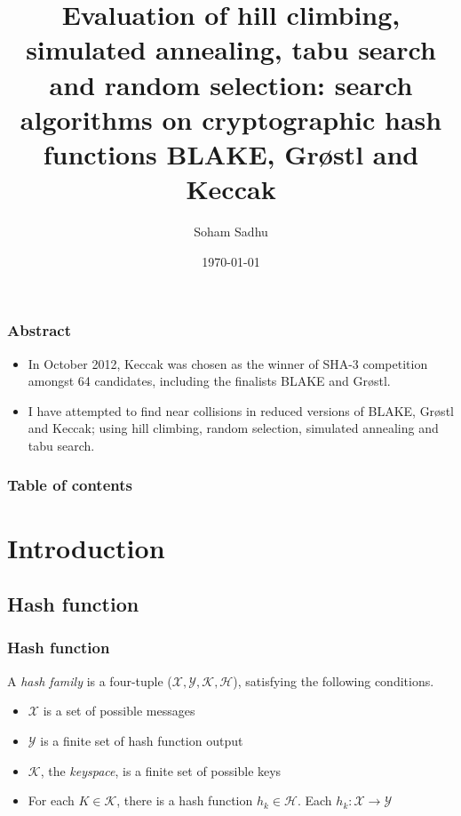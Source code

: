 \documentclass{beamer}
\begin{document}
\title{Evaluation of hill climbing, simulated annealing, tabu search and random selection: search algorithms
       on cryptographic hash functions BLAKE, Gr{\o}stl and Keccak}  
\author{Soham Sadhu}
\date{\today} 

\begin{frame}
\titlepage
\end{frame}

\begin{frame}
\frametitle{Abstract}
\begin{itemize}
\item In October 2012, Keccak was chosen as the winner of SHA-3 competition amongst 64 candidates, including 
the finalists BLAKE and Gr{\o}stl.
\item I have attempted to find near collisions in reduced versions of BLAKE, Gr{\o}stl and Keccak; using hill
climbing, random selection, simulated annealing and tabu search.
\end{itemize}
\end{frame}

\begin{frame}
\frametitle{Table of contents}
\tableofcontents
\end{frame} 

\section{Introduction}

\subsection{Hash function}
\begin{frame}
  \frametitle{Hash function}
  A \emph{hash family} is a four-tuple ($\mathcal{X}, \mathcal{Y}, \mathcal{K}, \mathcal{H}$),
  satisfying the following conditions.\footnotemark
  \begin{itemize}
    \item $\mathcal{X}$ is a set of possible messages
    \item $\mathcal{Y}$ is a finite set of hash function output
    \item $\mathcal{K}$, the \emph{keyspace}, is a finite set of possible keys
    \item For each $K \in \mathcal{K}$, there is a hash function $h_{k} \in \mathcal{H}$. Each 
      $h_{k}: \mathcal{X} \to \mathcal{Y}$ 
  \end{itemize}
\end{frame}
\end{document}
